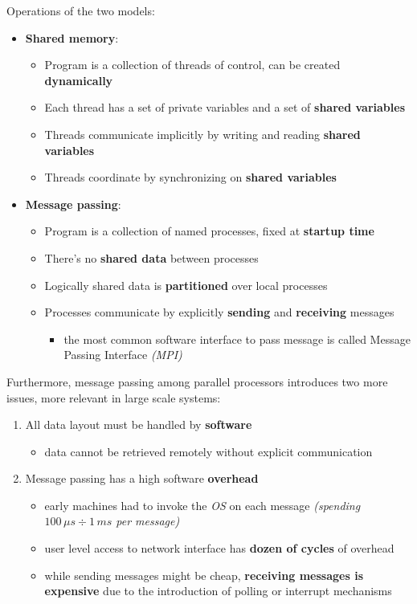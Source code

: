 \documentclass[english]{article}
\begin{document}
Operations of the two models:

\begin{itemize}
  \item \textbf{Shared memory}:
        \begin{itemize}
          \item Program is a collection of threads of control, can be created \textbf{dynamically}
          \item Each thread has a set of private variables and a set of \textbf{shared variables}
          \item Threads communicate implicitly by writing and reading \textbf{shared variables}
          \item Threads coordinate by synchronizing on \textbf{shared variables}
        \end{itemize}
  \item \textbf{Message passing}:
        \begin{itemize}
          \item Program is a collection of named processes, fixed at \textbf{startup time}
          \item There's no \textbf{shared data} between processes
          \item Logically shared data is \textbf{partitioned} over local processes
          \item Processes communicate by explicitly \textbf{sending} and \textbf{receiving} messages
                \begin{itemize}
                  \item the most common software interface to pass message is called Message Passing Interface \textit{(MPI)}
                \end{itemize}
        \end{itemize}
\end{itemize}

\bigskip
Furthermore, message passing among parallel processors introduces two more issues, more relevant in large scale systems:

\begin{enumerate}
  \item All data layout must be handled by \textbf{software}
        \begin{itemize}
          \item data cannot be retrieved remotely without explicit communication
        \end{itemize}
  \item Message passing has a high software \textbf{overhead}
        \begin{itemize}
          \item early machines had to invoke the \textit{OS} on each message \textit{(spending \(100\,\mu s \div 1\,ms\) per message)}
          \item user level access to network interface has \textbf{dozen of cycles} of overhead
          \item while sending messages might be cheap, \textbf{receiving messages is expensive} due to the introduction of polling or interrupt mechanisms
        \end{itemize}
\end{enumerate}
\end{document}
